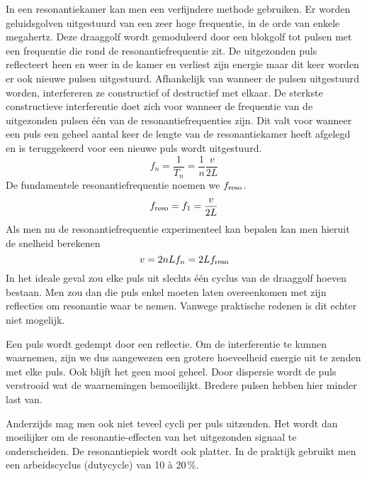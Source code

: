 In een resonantiekamer kan men een verfijndere methode gebruiken. Er worden 
geluidsgolven uitgestuurd van een zeer hoge frequentie, in de orde van enkele 
megahertz. Deze draaggolf wordt gemoduleerd door een blokgolf tot pulsen met 
een frequentie die rond de resonantiefrequentie zit. De uitgezonden puls 
reflecteert heen en weer in de kamer en verliest zijn energie maar dit keer 
worden er ook nieuwe pulsen uitgestuurd. Afhankelijk van wanneer de pulsen 
uitgestuurd worden, interfereren ze constructief of destructief met elkaar. De 
sterkste constructieve interferentie doet zich voor wanneer de frequentie van 
de uitgezonden pulsen \'e\'en van de resonantiefrequenties zijn. Dit valt voor 
wanneer een puls een geheel aantal keer de lengte van de resonantiekamer heeft 
afgelegd en is teruggekeerd voor een nieuwe puls wordt uitgestuurd.
\begin{equation}
\label{resfreq}
f_n = \frac{1}{T_n} = \frac{1}{n} \frac{v}{2L}
\end{equation}
De fundamentele resonantiefrequentie noemen we $f_\mathrm{reso}$.
$$
f_\mathrm{reso} = f_1 = \frac{v}{2L}
$$
Als men nu de resonantiefrequentie experimenteel kan bepalen kan men hieruit de 
snelheid berekenen
\begin{equation}
\label{v-ifv-f}
v = 2nLf_n = 2L f_\mathrm{reso}
\end{equation}
In het ideale geval zou elke puls uit slechts \'e\'en cyclus van de draaggolf 
hoeven bestaan. Men zou dan die puls enkel moeten laten overeenkomen met zijn 
reflecties om resonantie waar te nemen. Vanwege praktische redenen is dit 
echter niet mogelijk.

Een puls wordt gedempt door een reflectie. Om de interferentie te kunnen 
waarnemen, zijn we dus aangewezen een grotere hoeveelheid energie uit te zenden 
met elke puls. Ook blijft het geen mooi geheel. Door dispersie wordt de puls 
verstrooid wat de waarnemingen bemoeilijkt. Bredere pulsen hebben hier minder 
last van.


Anderzijds mag men ook niet teveel cycli per puls uitzenden. Het wordt dan 
moeilijker om de resonantie-effecten van het uitgezonden signaal te 
onderscheiden. De resonantiepiek wordt ook platter. In de praktijk gebruikt men 
een arbeidscyclus (dutycycle) van 10 \`a 20\,\%.




